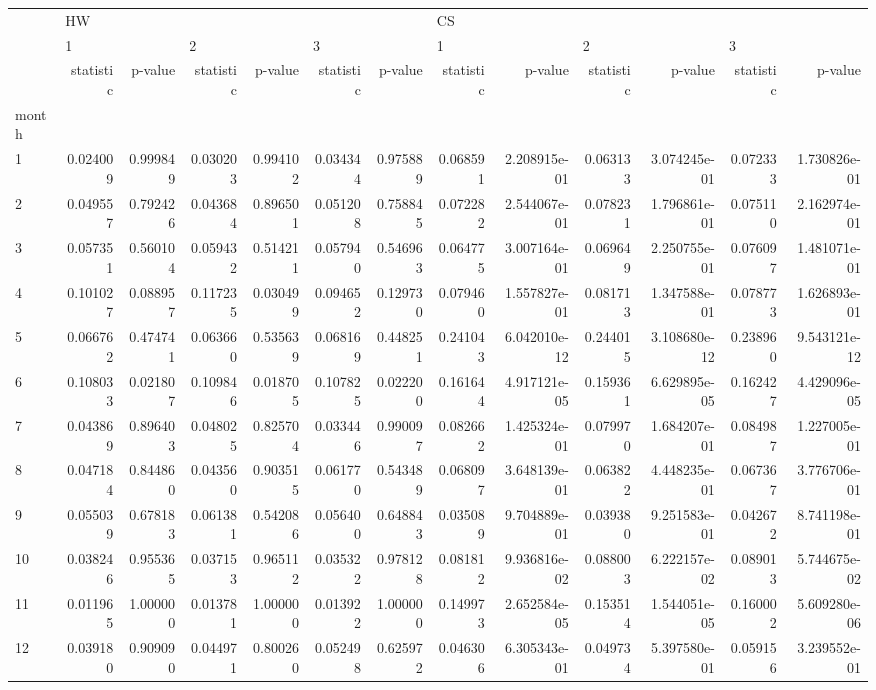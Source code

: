 \begin{tabular}{lrrrrrrrrrrrr}
\toprule
{} & \multicolumn{6}{l}{HW} & \multicolumn{6}{l}{CS} \\
{} & \multicolumn{2}{l}{1} & \multicolumn{2}{l}{2} & \multicolumn{2}{l}{3} & \multicolumn{2}{l}{1} & \multicolumn{2}{l}{2} & \multicolumn{2}{l}{3} \\
{} & statistic &   p-value & statistic &   p-value & statistic &   p-value & statistic &       p-value & statistic &       p-value & statistic &       p-value \\
month &           &           &           &           &           &           &           &               &           &               &           &               \\
\midrule
1     &  0.024009 &  0.999849 &  0.030203 &  0.994102 &  0.034344 &  0.975889 &  0.068591 &  2.208915e-01 &  0.063133 &  3.074245e-01 &  0.072333 &  1.730826e-01 \\
2     &  0.049557 &  0.792426 &  0.043684 &  0.896501 &  0.051208 &  0.758845 &  0.072282 &  2.544067e-01 &  0.078231 &  1.796861e-01 &  0.075110 &  2.162974e-01 \\
3     &  0.057351 &  0.560104 &  0.059432 &  0.514211 &  0.057940 &  0.546963 &  0.064775 &  3.007164e-01 &  0.069649 &  2.250755e-01 &  0.076097 &  1.481071e-01 \\
4     &  0.101027 &  0.088957 &  0.117235 &  0.030499 &  0.094652 &  0.129730 &  0.079460 &  1.557827e-01 &  0.081713 &  1.347588e-01 &  0.078773 &  1.626893e-01 \\
5     &  0.066762 &  0.474741 &  0.063660 &  0.535639 &  0.068169 &  0.448251 &  0.241043 &  6.042010e-12 &  0.244015 &  3.108680e-12 &  0.238960 &  9.543121e-12 \\
6     &  0.108033 &  0.021807 &  0.109846 &  0.018705 &  0.107825 &  0.022200 &  0.161644 &  4.917121e-05 &  0.159361 &  6.629895e-05 &  0.162427 &  4.429096e-05 \\
7     &  0.043869 &  0.896403 &  0.048025 &  0.825704 &  0.033446 &  0.990097 &  0.082662 &  1.425324e-01 &  0.079970 &  1.684207e-01 &  0.084987 &  1.227005e-01 \\
8     &  0.047184 &  0.844860 &  0.043560 &  0.903515 &  0.061770 &  0.543489 &  0.068097 &  3.648139e-01 &  0.063822 &  4.448235e-01 &  0.067367 &  3.776706e-01 \\
9     &  0.055039 &  0.678183 &  0.061381 &  0.542086 &  0.056400 &  0.648843 &  0.035089 &  9.704889e-01 &  0.039380 &  9.251583e-01 &  0.042672 &  8.741198e-01 \\
10    &  0.038246 &  0.955365 &  0.037153 &  0.965112 &  0.035322 &  0.978128 &  0.081812 &  9.936816e-02 &  0.088003 &  6.222157e-02 &  0.089013 &  5.744675e-02 \\
11    &  0.011965 &  1.000000 &  0.013781 &  1.000000 &  0.013922 &  1.000000 &  0.149973 &  2.652584e-05 &  0.153514 &  1.544051e-05 &  0.160002 &  5.609280e-06 \\
12    &  0.039180 &  0.909090 &  0.044971 &  0.800260 &  0.052498 &  0.625972 &  0.046306 &  6.305343e-01 &  0.049734 &  5.397580e-01 &  0.059156 &  3.239552e-01 \\
\bottomrule
\end{tabular}

